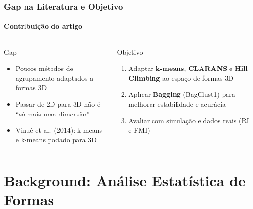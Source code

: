 \documentclass[brazilian,11pt]{beamer}
\begin{document}
\begin{frame}
    \frametitle{Gap na Literatura e Objetivo}
    \framesubtitle{Contribuição do artigo}

    \begin{columns}[T]
        \begin{block}{Gap}
            \begin{itemize}
                \item Poucos métodos de agrupamento adaptados a formas 3D
                \item Passar de 2D para 3D não é ``só mais uma dimensão''
                \item Vinué et al.\ (2014): k-means e k-means podado para 3D
            \end{itemize}
        \end{block}

        \begin{block}{Objetivo}
            \begin{enumerate}
                \item Adaptar \textbf{k-means}, \textbf{CLARANS} e \textbf{Hill Climbing} ao espaço de formas 3D
                \item Aplicar \textbf{Bagging} (BagClust1) para melhorar estabilidade e acurácia
                \item Avaliar com simulação e dados reais (RI e FMI)
            \end{enumerate}
        \end{block}
    \end{columns}
\end{frame}

\section[Formas]{Background: Análise Estatística de Formas}
\end{document}
